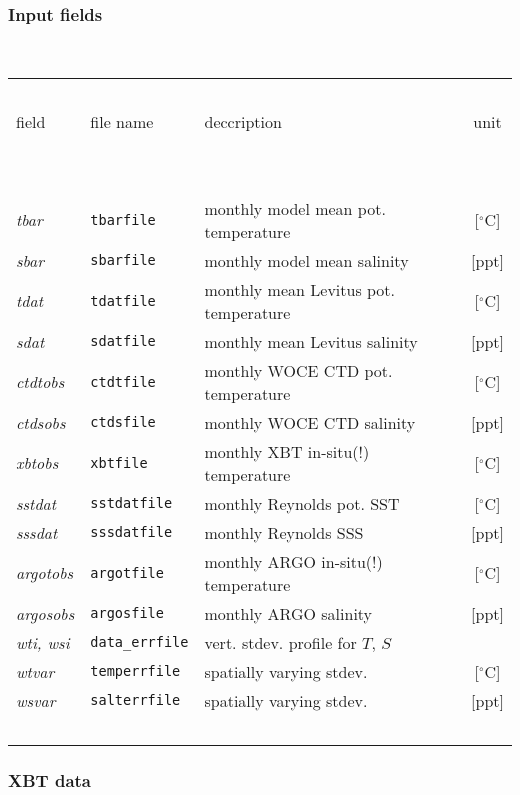 \subsubsection{Input fields}
~

\begin{table}[h!]
\begin{center}
\begin{tabular}{lllc}
\hline \hline
~&~&~&~\\
field & file name & deccription & unit \\
~&~&~&~\\
\hline
~&~&~&~\\
{\it tbar} & {\tt tbarfile} & monthly model mean pot. temperature & 
[$^{\circ}$C] \\
{\it sbar} & {\tt sbarfile} & monthly model mean salinity & 
[ppt] \\
{\it tdat} & {\tt tdatfile} & monthly mean Levitus pot. temperature & 
[$^{\circ}$C] \\
{\it sdat} & {\tt sdatfile} & monthly mean Levitus salinity & 
[ppt] \\
{\it ctdtobs}  & {\tt ctdtfile} & monthly WOCE CTD pot. temperature & 
[$^{\circ}$C] \\
{\it ctdsobs}  & {\tt ctdsfile} & monthly WOCE CTD salinity & 
[ppt] \\
{\it xbtobs} & {\tt xbtfile} & monthly XBT in-situ(!) temperature & 
[$^{\circ}$C] \\
{\it sstdat}  & {\tt sstdatfile} & monthly Reynolds pot. SST & 
[$^{\circ}$C] \\
{\it sssdat}  & {\tt sssdatfile} & monthly Reynolds SSS & 
[ppt] \\
{\it argotobs}  & {\tt argotfile} & monthly ARGO in-situ(!) temperature & 
[$^{\circ}$C] \\
{\it argosobs}  & {\tt argosfile} & monthly ARGO salinity & 
[ppt] \\
{\it wti, wsi} & {\tt data\_errfile} & vert. stdev. profile for $T$, $S$ &
~ \\
{\it wtvar} & {\tt temperrfile} & spatially varying stdev. & [$^{\circ}$C] \\
{\it wsvar} & {\tt salterrfile} & spatially varying stdev. & [ppt] \\
~&~&~&~\\
\hline \hline
\end{tabular}
\end{center}
\end{table}

\subsubsection{XBT data}


